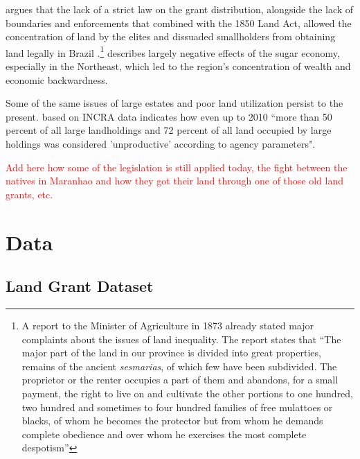 \documentclass[11pt]{article}
\newcommand{\red}[1]{\textcolor{red}{#1}}
\begin{document}
\textcite{Da_Cruz2023-gg} argues that the lack of a strict law on the grant distribution, alongside the lack of boundaries and enforcements that combined with the 1850 Land Act, allowed the concentration of land by the elites and dissuaded smallholders from obtaining land legally in Brazil .\footnote{A report to the Minister of Agriculture in 1873 already stated major complaints about the issues of land inequality. The report states that ``The major part of the land in our province is divided into great properties, remains of the ancient \textit{sesmarias}, of which few have been subdivided. The proprietor or the renter occupies a part of them and abandons, for a small payment, the right to live on and cultivate the other portions to one hundred, two hundred and sometimes to four hundred families of free mulattoes or blacks, of whom he becomes the protector but from whom he demands complete obedience and over whom he exercises the most complete despotism''\parencite[p.~325]{Smith1972-dv}}
\textcite[p.~16]{Baer2014-gh} describes largely negative effects of the sugar economy, especially in the Northeast, which led to the region's concentration of wealth and economic backwardness.

Some of the same issues of large estates and poor land utilization persist to the present. \textcite{Carlson2019-mk} based on INCRA data indicates how even up to 2010 ``more than 50 percent of all large landholdings and 72 percent of all land occupied by large holdings was considered 'unproductive' according to agency parameters".

\red{Add here how some of the legislation is still applied today, the fight between the natives in Maranhao and how they got their land through one of those old land grants, etc.}



\section{Data}
\label{sec:data}

\subsection{Land Grant Dataset}
\end{document}
